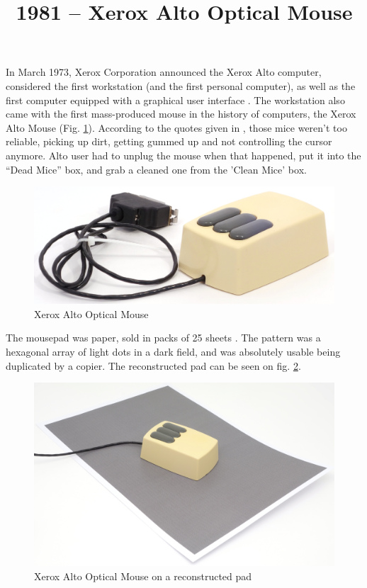 \documentclass[11pt, a4paper]{article}
\begin{document}
\title{1981 -- Xerox Alto Optical Mouse}
\date{}
\maketitle
{}

In March 1973, Xerox Corporation announced the Xerox Alto computer, considered the first workstation (and the first personal computer), as well as the first computer equipped with a graphical user interface \cite{wiki}. The workstation also came with the first mass-produced mouse in the history of computers, the Xerox Alto Mouse (Fig. \ref{fig:XeroxAltoPic}). According to the quotes given in \cite{mouses}, those mice weren't too reliable, picking up dirt, getting gummed up and not controlling the cursor anymore. Alto user had to unplug the mouse when that happened, put it into the ``Dead Mice''  box, and grab a cleaned one from the 'Clean Mice' box.

\begin{figure}[h]
    \centering
    \includegraphics[scale=0.7]{1981_xerox_alto_mouse/pic_30.jpg}
    \caption{Xerox Alto Optical Mouse}
    \label{fig:XeroxAltoPic}
\end{figure}

The mousepad was paper, sold in packs of 25 sheets \cite{pad}. The pattern was a
hexagonal array of light dots in a dark field, and was absolutely usable being duplicated by a copier. The reconstructed pad can be seen on fig. \ref{fig:XeroxAltoPad}.

\begin{figure}[h]
    \centering
    \includegraphics[scale=0.4]{1981_xerox_alto_mouse/pad_30.jpg}
    \caption{Xerox Alto Optical Mouse on a reconstructed pad}
    \label{fig:XeroxAltoPad}
\end{figure}
\end{document}
